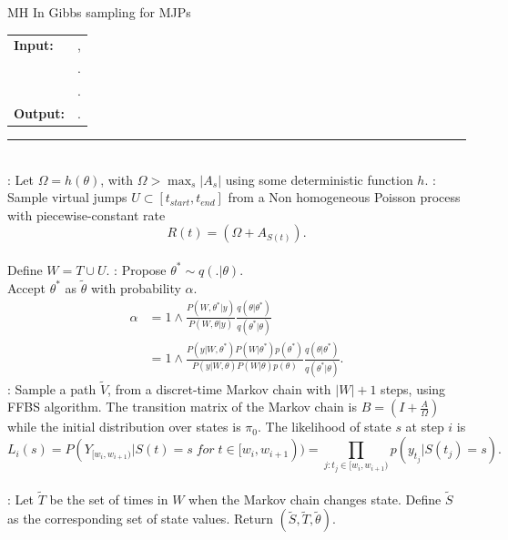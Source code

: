 \begin{algorithm}[H]
   \caption{MH In Gibbs sampling for MJPs }
   \label{alg:MH In Gibbs}
\begin{algorithmic}
  \State 
  \begin{tabular}{l l}
   \textbf{Input:  } & \text{A set of partial and noisy observations $y_{[t_0, t_{N+1})}$}, \\
                      & \text{Initial distribution over states $\pi_0$,  Metropolis Hasting proposal $q(. | \theta)$}.\\
                      & \text{The previous MJP path $S(t) = (S, T)$, the previous MJP parameters $\theta$}.\\ 
 \textbf{Output:  }& \text{A new MJP trajectory $\tilde{S} (t) = (\tilde{S}, \tilde{T})$, A series of MJP parameters $\tilde{\theta}$}.
   \end{tabular}
   \hrule \\
    : Let $\Omega = h(\theta)$, with $\Omega > \max_s{|A_s|}$ using some deterministic function $h$.
    : Sample virtual jumps $U\subset[t_{start}, t_{end}]$ from a Non homogeneous Poisson process with piecewise-constant rate$$R(t) = (\Omega + A_{S(t)}).$$\\Define $W = T \cup U$.
    : Propose $\theta^* \sim q(.| \theta)$.\\
        Accept $\theta^*$ as $\tilde{\theta}$ with probability $\alpha$.
        \begin{align*}
        \alpha &=  1 \wedge \frac{P(W,\theta^*| y)}{P(W, \theta| y)} \frac{q(\theta|\theta^*)}{q(\theta^*|\theta)}\\
        &=  1 \wedge \frac{P(y| W,\theta^*) P(W | \theta^*)p(\theta^*)}{P(y|W, \theta)P(W | \theta)p(\theta)} \frac{q(\theta|\theta^*)}{q(\theta^*|\theta)}.
        \end{align*}
    : Sample a path $\tilde{V}$, from a discret-time Markov chain with $|W| + 1$ steps, using FFBS algorithm. The transition matrix of the Markov chain is $B = (I + \frac{A}{\Omega})$ while the initial distribution over states is $\pi_0$. The likelihood of state $s$ at step $i$ is 
    $$ L_i(s) = P(Y_{[w_i, w_{i + 1})} | S(t) = s \; for\; t \in [w_i, w_{i + 1})) = \prod_{j: t_j \in [w_i, w_{i + 1})}p(y_{t_j} | S(t_j) = s).$$\\
    : Let $\tilde{T}$ be the set of times in $W$ when the Markov chain changes state. Define $\tilde{S}$ as the corresponding set of state values. Return $(\tilde{S}, \tilde{T}, \tilde{\theta})$.\\
\end{algorithmic}
\end{algorithm}
\label{sec:meth}

